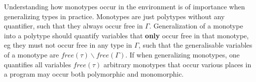 Understanding how monotypes occur in the environment is of importance when generalizing types in practice.
Monotypes are just polytypes without any quantifier, such that they always occur free in $\Gamma$.
Generalization of a monotype into a polytype should quantify variables that \textbf{only} occur free in that monotype, eg they must not occur free in any type in $\Gamma$, such that the generalisable variables of a monotype are $\textit{free}(\tau) \backslash \textit{free}(\Gamma)$.
If when generalizing monotypes, one quantifies all variables $\textit{free}(\tau)$ arbitrary monotypes that occur various places in a program may occur both polymorphic and monomorphic.

